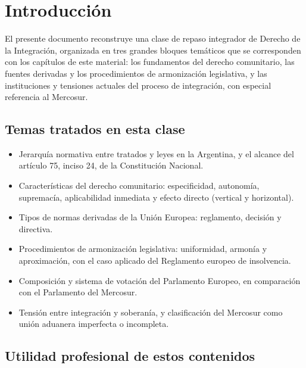 \documentclass[12pt,oneside]{book}
\begin{document}
\tableofcontents


\chapter*{Introducción}

El presente documento reconstruye una clase de repaso integrador de Derecho de la Integración, organizada en tres grandes bloques temáticos que se corresponden con los capítulos de este material: los fundamentos del derecho comunitario, las fuentes derivadas y los procedimientos de armonización legislativa, y las instituciones y tensiones actuales del proceso de integración, con especial referencia al Mercosur.

\section*{Temas tratados en esta clase}
\begin{itemize}
    \item Jerarquía normativa entre tratados y leyes en la Argentina, y el alcance del artículo 75, inciso 24, de la Constitución Nacional.
    \item Características del derecho comunitario: especificidad, autonomía, supremacía, aplicabilidad inmediata y efecto directo (vertical y horizontal).
    \item Tipos de normas derivadas de la Unión Europea: reglamento, decisión y directiva.
    \item Procedimientos de armonización legislativa: uniformidad, armonía y aproximación, con el caso aplicado del Reglamento europeo de insolvencia.
    \item Composición y sistema de votación del Parlamento Europeo, en comparación con el Parlamento del Mercosur.
    \item Tensión entre integración y soberanía, y clasificación del Mercosur como unión aduanera imperfecta o incompleta.
\end{itemize}

\section*{Utilidad profesional de estos contenidos}
\end{document}
